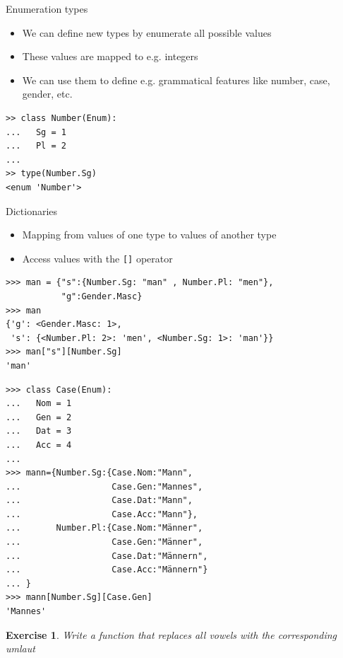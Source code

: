\documentclass{beamer}
\newtheorem{exercise}{Exercise}
\begin{document}
\begin{frame}[fragile]{Enumeration types}
  \begin{itemize}
  \item We can define new types by enumerate all possible values
  \item These values are mapped to e.g. integers
  \item We can use them to define e.g. grammatical features like number, case, gender, etc.
  \end{itemize}
\begin{verbatim}
>> class Number(Enum):
...   Sg = 1
...   Pl = 2
... 
>> type(Number.Sg)
<enum 'Number'>
\end{verbatim}
\end{frame}
\begin{frame}[fragile]{Dictionaries}
  \begin{itemize}
  \item Mapping from values of one type to values of another type
  \item Access values with the \texttt{[]} operator
  \end{itemize}
\begin{verbatim}
>>> man = {"s":{Number.Sg: "man" , Number.Pl: "men"}, 
           "g":Gender.Masc}
>>> man
{'g': <Gender.Masc: 1>, 
 's': {<Number.Pl: 2>: 'men', <Number.Sg: 1>: 'man'}}
>>> man["s"][Number.Sg]
'man'
\end{verbatim}
\end{frame}

\begin{frame}[fragile]
\begin{verbatim}
>>> class Case(Enum):
...   Nom = 1
...   Gen = 2
...   Dat = 3
...   Acc = 4
... 
>>> mann={Number.Sg:{Case.Nom:"Mann", 
...                  Case.Gen:"Mannes", 
...                  Case.Dat:"Mann", 
...                  Case.Acc:"Mann"},
...       Number.Pl:{Case.Nom:"Männer", 
...                  Case.Gen:"Männer", 
...                  Case.Dat:"Männern", 
...                  Case.Acc:"Männern"}
... }
>>> mann[Number.Sg][Case.Gen]
'Mannes'
\end{verbatim}
\end{frame}

\begin{frame}
  \begin{exercise}
    Write a function that replaces all vowels with the corresponding umlaut
  \end{exercise}
\end{frame}
\end{document}
